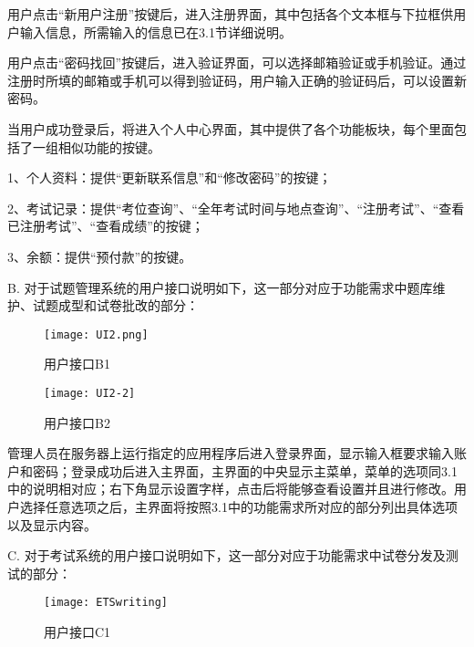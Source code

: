 用户点击“新用户注册”按键后，进入注册界面，其中包括各个文本框与下拉框供用户输入信息，所需输入的信息已在3.1节详细说明。

用户点击“密码找回”按键后，进入验证界面，可以选择邮箱验证或手机验证。通过注册时所填的邮箱或手机可以得到验证码，用户输入正确的验证码后，可以设置新密码。

当用户成功登录后，将进入个人中心界面，其中提供了各个功能板块，每个里面包括了一组相似功能的按键。

1、个人资料：提供“更新联系信息”和“修改密码”的按键；
	
2、考试记录：提供“考位查询”、“全年考试时间与地点查询”、“注册考试”、“查看已注册考试”、“查看成绩”的按键；

3、余额：提供“预付款”的按键。

B. 对于试题管理系统的用户接口说明如下，这一部分对应于功能需求中题库维护、试题成型和试卷批改的部分：

\begin{figure}[ht]
\centering
\texttt{[image: UI2.png]}
\caption{用户接口B1}\label{fig:noted-figure}
\end{figure}

\begin{figure}[ht]
\centering
\texttt{[image: UI2-2]}
\caption{用户接口B2}\label{fig:noted-figure}
\end{figure}

管理人员在服务器上运行指定的应用程序后进入登录界面，显示输入框要求输入账户和密码；登录成功后进入主界面，主界面的中央显示主菜单，菜单的选项同3.1中的说明相对应；右下角显示设置字样，点击后将能够查看设置并且进行修改。用户选择任意选项之后，主界面将按照3.1中的功能需求所对应的部分列出具体选项以及显示内容。

C. 对于考试系统的用户接口说明如下，这一部分对应于功能需求中试卷分发及测试的部分：

\begin{figure}[ht]
\centering
\texttt{[image: ETSwriting]}
\caption{用户接口C1}\label{fig:noted-figure}
\end{figure}

